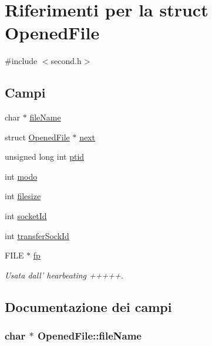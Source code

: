 \hypertarget{structOpenedFile}{\section{Riferimenti per la struct Opened\+File}
\label{structOpenedFile}
}


{\ttfamily \#include $<$second.\+h$>$}

\subsection*{Campi}
\begin{DoxyCompactItemize}
\item 
char $\ast$ \hyperlink{structOpenedFile_abcff0610dfa8b1e3836b3f5bac40c8f5}{file\+Name}
\item 
struct \hyperlink{structOpenedFile}{Opened\+File} $\ast$ \hyperlink{structOpenedFile_a9b8c8b995cdda6da249a6ce9a9df98b2}{next}
\item 
unsigned long int \hyperlink{structOpenedFile_a33cb5376fd14129a1635cf142c0781a6}{ptid}
\item 
int \hyperlink{structOpenedFile_a6d9f22ff6ba81506ba9c4a60f27c4f32}{modo}
\item 
int \hyperlink{structOpenedFile_a3b2e157f5aad06b65bd017d67fde4eb3}{filesize}
\item 
int \hyperlink{structOpenedFile_a2af35018ecff06dbd349d464c815038a}{socket\+Id}
\item 
int \hyperlink{structOpenedFile_a122a7d3d722dc1f7c63857af2024f098}{transfer\+Sock\+Id}
\item 
F\+I\+L\+E $\ast$ \hyperlink{structOpenedFile_a9cdcaccacb2eb66a17c0781666c28b15}{fp}
\begin{DoxyCompactList}\small\item\em Usata dall' hearbeating +++++. \end{DoxyCompactList}\end{DoxyCompactItemize}


\subsection{Documentazione dei campi}
\hypertarget{structOpenedFile_abcff0610dfa8b1e3836b3f5bac40c8f5}{
\subsubsection[{file\+Name}]{\setlength{\rightskip}{0pt plus 5cm}char $\ast$ Opened\+File\+::file\+Name}}\label{structOpenedFile_abcff0610dfa8b1e3836b3f5bac40c8f5}



